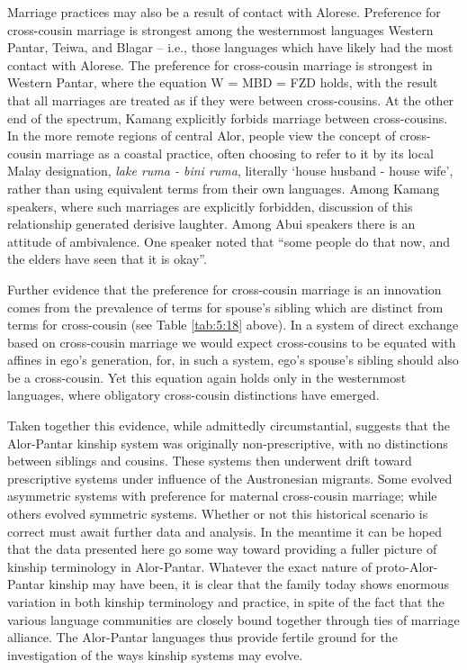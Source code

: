 Marriage practices may also be a result of contact with Alorese. Preference for cross-cousin marriage is strongest among the westernmost languages Western Pantar, Teiwa, and Blagar -- i.e., those languages which have likely had the most contact with Alorese. The preference for cross-cousin marriage is strongest in Western Pantar, where the equation W = MBD = FZD holds, with the result that all marriages are treated as if they were between cross-cousins. At the other end of the spectrum, Kamang explicitly forbids marriage between cross-cousins. In the more remote regions of central Alor, people view the concept of cross-cousin marriage as a coastal practice, often choosing to refer to it by its local Malay designation, \textit{lake ruma - bini ruma}, literally `house husband - house wife', rather than using equivalent terms from their own languages. Among Kamang speakers, where such marriages are explicitly forbidden, discussion of this relationship generated derisive laughter. Among Abui speakers there is an attitude of ambivalence. One speaker noted that ``some people do that now, and the elders have seen that it is okay''. 

Further evidence that the preference for cross-cousin marriage is an innovation comes from the prevalence of terms for spouse's  sibling which are distinct from terms for cross-cousin (see Table \ref{tab:5:18} above). In a system of direct exchange based on cross-cousin marriage we would expect cross-cousins to be equated with affines in ego's generation, for, in such a system, ego's spouse's sibling should also be a cross-cousin. Yet this equation again holds only in the westernmost languages, where obligatory cross-cousin distinctions have emerged. 

Taken together this evidence, while admittedly circumstantial, suggests that the Alor-Pantar kinship system was originally non-prescriptive, with no distinctions between siblings and cousins. These systems then underwent drift toward prescriptive systems under influence of the Austronesian migrants. Some evolved asymmetric systems with preference for maternal cross-cousin marriage; while others evolved symmetric systems. Whether or not this historical scenario is correct must await further data and analysis. In the meantime it can be hoped that the data presented here go some way toward providing a fuller picture of kinship terminology in Alor-Pantar. Whatever the exact nature of proto-Alor-Pantar kinship may have been, it is clear that the family today shows enormous variation in both kinship terminology and practice, in spite of the fact that the various language communities are closely bound together through ties of marriage alliance. The Alor-Pantar languages thus provide fertile ground for the investigation of the ways kinship systems may evolve.

